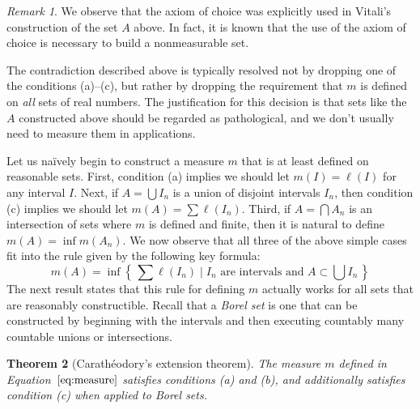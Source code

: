 \documentclass[11pt,oneside]{amsbook}
\newcommand{\set}[1]{\left\{\,#1\,\right\}}
\theoremstyle{definition}
\theoremstyle{plain}
\newtheorem{theorem}{Theorem}[section]
\theoremstyle{definition}
\theoremstyle{remark}
\newtheorem{remark}[theorem]{Remark}
\numberwithin{equation}{section}
\numberwithin{figure}{section}
\begin{document}
\begin{remark}
  We observe that the axiom of choice was explicitly used in Vitali's construction of the set $A$ above. In fact, it is known that the use of the axiom of choice is necessary to build a nonmeasurable set.
\end{remark}

The contradiction described above is typically resolved not by dropping one of the conditions (a)--(c), but rather by dropping the requirement that $m$ is defined on \emph{all} sets of real numbers. The justification for this decision is that sets like the $A$ constructed above should be regarded as pathological, and we don't usually need to measure them in applications.

Let us na\"ively begin to construct a measure $m$ that is at least defined on reasonable sets. First, condition (a) implies we should let $m(I)=\ell(I)$ for any interval $I$. Next, if $A=\bigcup I_n$ is a union of disjoint intervals $I_n$, then condition (c) implies we should let $m(A)=\sum\ell(I_n)$. Third, if $A=\bigcap A_n$ is an intersection of sets where $m$ is defined and finite, then it is natural to define $m(A)=\inf m(A_n)$. We now observe that all three of the above simple cases fit into the rule given by the following key formula:
\begin{equation}
  \label{eq:measure}
  m(A)=\inf\set{\sum\ell(I_n)\mid \text{$I_n$ are intervals and }A\subset\bigcup I_n}
\end{equation}
The next result states that this rule for defining $m$ actually works for all sets that are reasonably constructible. Recall that a \emph{Borel set} is one that can be constructed by beginning with the intervals and then executing countably many countable unions or intersections.

\begin{theorem}[Carath\'eodory's extension theorem]
  \label{thm:caratheodory}
  The measure $m$ defined in Equation~$\eqref{eq:measure}$ satisfies conditions (a) and (b), and additionally satisfies condition (c) when applied to Borel sets.
\end{theorem}
\end{document}
